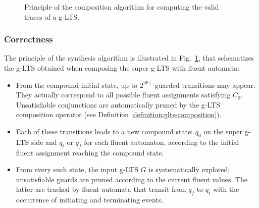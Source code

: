 \begin{figure}
\centering
{}
\caption{Principle of the composition algorithm for computing the valid traces of a g-LTS.\label{image:glts2lts-intuition}}
\end{figure}

\subsubsection*{Correctness}

The principle of the synthesis algorithm is illustrated in Fig.~\ref{image:glts2lts-intuition}, that schematizes the g-LTS obtained when composing the super g-LTS with fluent automata:
\begin{itemize}
\item From the compound initial state, up to $2^{\mid\Phi\mid}$ guarded transitions may appear. They actually correspond to all possible fluent assignments satisfying $C_0$. Unsatisfiable conjunctions are automatically pruned by the g-LTS composition operator (see Definition \ref{definition:glts-composition}).
\item Each of these transitions leads to a new compound state: $q_0$ on the super g-LTS side and $q_t$ or $q_f$ for each fluent automaton, according to the initial fluent assignment reaching the compound state.
\item From every such state, the input g-LTS $G$ is systematically explored; unsatisfiable guards are pruned according to the current fluent values. The latter are tracked by fluent automata that transit from $q_f$ to $q_t$ with the occurrence of initiating and terminating events.
\end{itemize}

